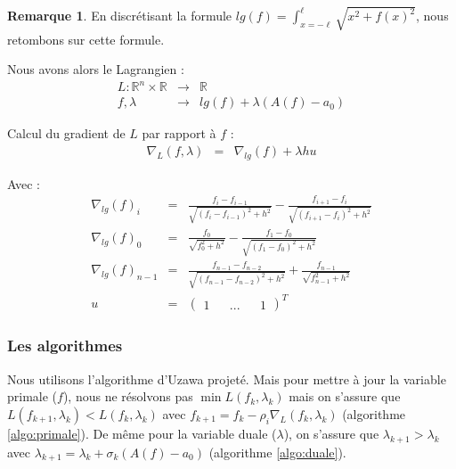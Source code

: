\documentclass[10pt,a4paper]{article}
\newcommand{\R}{\mathbb{R}}
\theoremstyle{plain}
\theoremstyle{definition}
\newtheorem{rem}[thm]{Remarque}
\begin{document}
\begin{rem}
En discrétisant la formule $lg(f) = \int_{x=-\ell}^{\ell}{\sqrt{x^2+f(x)^2}}$, nous retombons sur cette formule.
\end{rem}

Nous avons alors le Lagrangien :
\begin{eqnarray*}
L \colon \R^n \times \R &\rightarrow & \R \\
f, \lambda &\rightarrow & lg(f) + \lambda (A(f)-a_0)
\end{eqnarray*}

Calcul du gradient de $L$ par rapport à $f$ :
\begin{eqnarray*}
\nabla_L(f, \lambda) & = & \nabla_{lg}(f) + \lambda h u
\end{eqnarray*}

Avec :
\begin{eqnarray*}
\nabla_{lg}(f)_i &=& \frac{f_i-f_{i-1}}{\sqrt{(f_i-f_{i-1})^2+h^2}} - \frac{f_{i+1}-f_i}{\sqrt{(f_{i+1}-f_i)^2+h^2}} \\
\nabla_{lg}(f)_0 &=& \frac{f_0}{\sqrt{f_0^2+h^2}} - \frac{f_{1}-f_0}{\sqrt{(f_{1}-f_0)^2+h^2}} \\
\nabla_{lg}(f)_{n-1} &=& \frac{f_{n-1}-f_{n-2}}{\sqrt{(f_{n-1}-f_{n-2})^2+h^2}} + \frac{f_{n-1}}{\sqrt{f_{n-1}^2+h^2}} \\
u &=& (\begin{matrix} 1 && ... && 1 \end{matrix})^T
\end{eqnarray*}

\subsubsection{Les algorithmes}

Nous utilisons l'algorithme d'Uzawa projeté. Mais pour mettre à jour la variable primale ($f$), nous ne résolvons pas $\min L(f_k,\lambda_k)$ mais on s'assure que $L(f_{k+1},\lambda_k) < L(f_k,\lambda_k)$ avec $f_{k+1} = f_k - \rho_i \nabla_L(f_k,\lambda_k)$ (algorithme \ref{algo:primale}). De même pour la variable duale ($\lambda$), on s'assure que $\lambda_{k+1} > \lambda_k$ avec $\lambda_{k+1} = \lambda_k + \sigma_k (A(f)-a_0)$ (algorithme \ref{algo:duale}).


\end{document}

